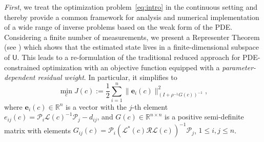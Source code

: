 \documentclass[12pt]{amsart}
\newcommand{\yy}[1]{\textcolor{blue}{{YY: #1}}}
\begin{document}
\emph{First}, we treat the optimization problem~\eqref{eq:intro} in the continuous setting and thereby provide a common framework for analysis and numerical implementation of a wide range of inverse problems based on the weak form of the PDE. Considering a finite number of measurements, we present a Representer Theorem (see ) which shows that the estimated state lives in a finite-dimensional subspace of $\mathsf{U}$. This leads to a re-formulation of the traditional reduced approach for PDE-constrained optimization with an objective function equipped with a \textit{parameter-dependent residual weight}. In particular, it simplifies to
\[
\min_c  J(c):={\textstyle{\frac{1}{2}}}\sum_{i=1}^n\|\mathbf{e}_i(c)\|_{(I + \rho^{-1} G(c))^{-1}}^2,
\]
where $\mathbf{e}_i(c) \in \mathbb{R}^n$ is a vector with the $j$-th element $e_{ij}(c) = \mathcal{P}_i\mathcal{L}(c)^{-1}\mathcal{P}_j- d_{ij}$, and $G(c)\in \mathbb{R}^{n\times n}$ is a positive semi-definite matrix with elements $G_{ij}(c) = \mathcal{P}_i\left(\mathcal{L}^*(c)\mathcal{R}\mathcal{L}(c)\right)^{-1}\mathcal{P}_j$, $1\leq i,j\leq n$. %
\end{document}
